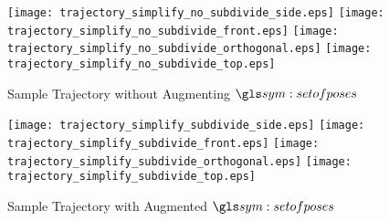 		\begin{figure}[hb]
			\centering
			\begin{minipage}{0.8\linewidth}
				\texttt{[image: trajectory\_simplify\_no\_subdivide\_side.eps]}
				\texttt{[image: trajectory\_simplify\_no\_subdivide\_front.eps]}
				\texttt{[image: trajectory\_simplify\_no\_subdivide\_orthogonal.eps]}
				\texttt{[image: trajectory\_simplify\_no\_subdivide\_top.eps]}
			\end{minipage}
			\caption{Sample Trajectory without Augmenting $\setofposes$}
			\label{fig:sample_trajectory_after_simplification}
		\end{figure}


		\begin{figure}[hb]
			\centering
			\begin{minipage}{0.8\linewidth}
				\texttt{[image: trajectory\_simplify\_subdivide\_side.eps]}
				\texttt{[image: trajectory\_simplify\_subdivide\_front.eps]}
				\texttt{[image: trajectory\_simplify\_subdivide\_orthogonal.eps]}
				\texttt{[image: trajectory\_simplify\_subdivide\_top.eps]}
			\end{minipage}
			\caption{Sample Trajectory with Augmented $\setofposes$}
			\label{fig:sample_trajectory_with_augmented_set_of_poses}
		\end{figure}
